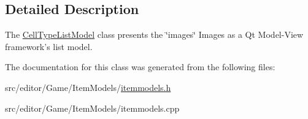 \subsection{\-Detailed \-Description}
\-The \hyperlink{class_cell_type_list_model}{\-Cell\-Type\-List\-Model} class presents the \char`\"{}images\char`\"{} \-Images as a \-Qt \-Model-\/\-View framework's list model. 

\-The documentation for this class was generated from the following files\-:\begin{DoxyCompactItemize}
\item 
src/editor/\-Game/\-Item\-Models/\hyperlink{itemmodels_8h}{itemmodels.\-h}\item 
src/editor/\-Game/\-Item\-Models/itemmodels.\-cpp\end{DoxyCompactItemize}
